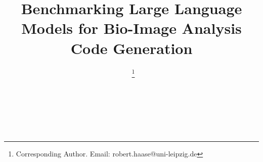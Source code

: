 \documentclass{ecai}
\begin{document}

\begin{frontmatter}




\title{Benchmarking Large Language Models for Bio-Image Analysis Code Generation}


\author[A,B]{~\thanks{Corresponding Author. Email: robert.haase@uni-leipzig.de}}
\author[C]{~}
\author[D,B]{~ } 

\address[A]{Data Science Center, Leipzig University, Humboldtstra{\ss}e 25, 04105 Leipzig, Germany}
\address[B]{Center for Scalable Data Analytics and Artificial Intelligence (ScaDS.AI) Dresden / Leipzig}
\address[C]{Data Science Centre, European Molecular Biology Laboratory, Meyerhofstra{\ss}e 1, 69117 Heidelberg, Germany}
\address[D]{Max Planck Institute for Human Cognitive and Brain Sciences, Stephanstra{\ss}e 1A, 04103, Leipzig, Germany}



\end{frontmatter}
\end{document}
